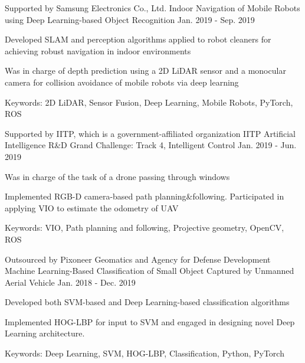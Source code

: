 \begin{cventries}
  \cventry
    {Supported by Samsung Electronics Co., Ltd.} %
    {Indoor Navigation of Mobile Robots using Deep Learning-based Object Recognition} %
    {\urban} %
    {Jan. 2019 - Sep. 2019} %
    {
      \begin{cvitems} %
        \item Developed SLAM and perception algorithms applied to robot cleaners for achieving robust navigation in indoor environments
        \item Was in charge of depth prediction using a 2D LiDAR sensor and a monocular camera for collision avoidance of mobile robots via deep learning
        \item Keywords: 2D LiDAR, Sensor Fusion, Deep Learning, Mobile Robots, PyTorch, ROS
      \end{cvitems}
    }

    \cventry
      {Supported by IITP, which is a government-affiliated organization} %
      {IITP Artificial Intelligence R\&D Grand Challenge: Track 4, Intelligent Control} %
      {\urban} %
      {Jan. 2019 - Jun. 2019} %
      {
        \begin{cvitems} %
          \item Was in charge of the task of a drone passing through windows
          \item Implemented RGB-D camera-based path planning\&following. Participated in applying VIO to estimate the odometry of UAV
          \item Keywords: VIO, Path planning and following, Projective geometry, OpenCV, ROS
        \end{cvitems}
      }

    \cventry
      {Outsourced by Pixoneer Geomatics and Agency for Defense Development} %
      {Machine Learning-Based Classification of Small Object Captured by Unmanned Aerial Vehicle} %
      {\urban} %
      {Jan. 2018 - Dec. 2019} %
      {
        \begin{cvitems} %
          \item Developed both SVM-based and Deep Learning-based classification algorithms
          \item Implemented HOG-LBP for input to SVM and engaged in designing novel Deep Learning architecture.
          \item Keywords: Deep Learning, SVM, HOG-LBP, Classification, Python, PyTorch
        \end{cvitems}
      }


\end{cventries}
